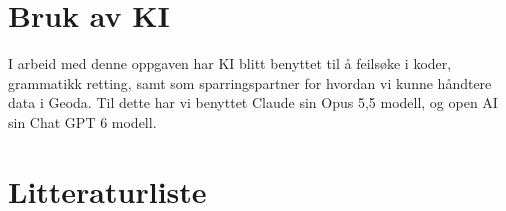 \documentclass[
  norsk,
  a4paper,
]{article}
\begin{document}
{\begin{longtable}[]
\end{longtable}

}

\section{Bruk av KI}\label{bruk-av-ki}

I arbeid med denne oppgaven har KI blitt benyttet til å feilsøke i
koder, grammatikk retting, samt som sparringspartner for hvordan vi
kunne håndtere data i Geoda. Til dette har vi benyttet Claude sin Opus
5,5 modell, og open AI sin Chat GPT 6 modell.

\section{Litteraturliste}\label{litteraturliste}
\end{document}
